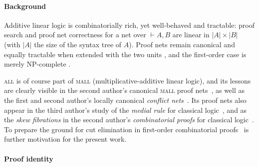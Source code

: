 \documentclass[a4paper,UKenglish]{lipics-v2019}
\newcommand\all{\textsc{all}}
\newcommand\mall{\textsc{mall}}
\newcommand\+{+}
\renewcommand\*{\times}
\newcommand\seq[2]{{\vdash}#1,#2}
\begin{document}
\paragraph*{Background}

Additive linear logic is combinatorially rich, yet well-behaved and tractable: proof search \cite{Galmiche-Marion-1995} and proof net correctness \cite{Heijltjes-Hughes-2015} for a net over $\seq AB$ are linear in $|A|\times|B|$ (with $|A|$ the size of the syntax tree of $A$). Proof nets remain canonical and equally tractable when extended with the two units \cite{Heijltjes-2011,Heijltjes-Hughes-2015}, and the first-order case is merely NP-complete \cite{Heijltjes-Hughes-2015}.

{\all} is of course part of {\mall} (multiplicative-additive linear logic), and its lessons are clearly visible in the second author's canonical {\mall} proof nets~\cite{Hughes-vanGlabbeek-2005}, as well as the first and second author's locally canonical \emph{conflict nets}~\cite{Hughes-Heijltjes-2016}. Its proof nets also appear in the third author's study of the \emph{medial rule} for classical logic~\cite{str:RTA07}, and as the \emph{skew fibrations} in the second author's \emph{combinatorial proofs} for classical logic~\cite{Hughes-2006-proofs}. To prepare the ground for cut elimination in first-order combinatorial proofs~\cite{Hughes-2019-fopws} is further motivation for the present work.

\paragraph*{Proof identity}
\end{document}
